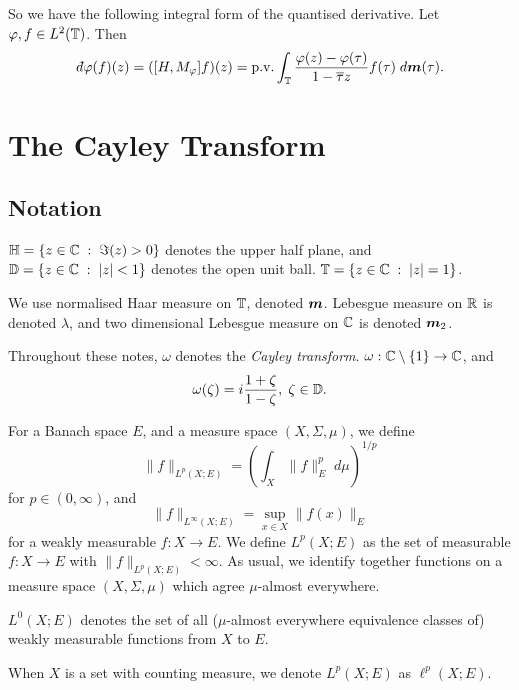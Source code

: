 So we have the following integral form of the quantised derivative. Let $\varphi,f \in L^2(\mathbb{T})$.
Then
\begin{equation*}
    \qd\varphi(f)(z) = ([H,M_\varphi]f)(z) = \pvint_\Circ \frac{\varphi(z)-\varphi(\tau)}{1-\overline{\tau}z}f(\tau)\;d\ha(\tau).
\end{equation*}

\section{The Cayley Transform}

\subsection{Notation}
$\mathbb{H} = \{z \in \mathbb{C}\;:\;\Im(z) > 0\}$ denotes the upper half plane,
and $\mathbb{D} = \{z\in \mathbb{C}\;:\; |z| < 1\}$ denotes the open unit ball.
$\mathbb{T} = \{z \in \mathbb{C}\;:\; |z| = 1\}$.

We use normalised Haar measure on $\mathbb{T}$, denoted $\boldsymbol{m}$. Lebesgue
measure on $\mathbb{R}$ is denoted $\lambda$, and two dimensional Lebesgue measure on
$\mathbb{C}$ is denoted $\boldsymbol{m}_2$.

Throughout these notes, $\omega$ denotes the \emph{Cayley transform}.
$\omega:\mathbb{C}\setminus\{1\}\rightarrow \mathbb{C}$, and 
\begin{equation*}
    \omega(\zeta) = i\frac{1+\zeta}{1-\zeta},\;\zeta \in \mathbb{D}.
\end{equation*}

For a Banach space $E$, and a measure space $(X,\Sigma,\mu)$, we define
\begin{equation*}
    \|f\|_{L^p(X;E)} = \left(\int_X \|f\|_E^p \;d\mu\right)^{1/p}
\end{equation*}
for $p \in (0,\infty)$, and
\begin{equation*}
    \|f\|_{L^\infty(X;E)} = \sup_{x \in X} \|f(x)\|_E
\end{equation*}
for a weakly measurable $f:X\rightarrow E$. We define $L^p(X;E)$ as the set
of measurable $f:X\rightarrow E$ with $\|f\|_{L^p(X;E)} < \infty$. As usual, 
we identify together functions on a measure space $(X,\Sigma,\mu)$ 
which agree $\mu$-almost everywhere.

$L^0(X;E)$ denotes the set of all ($\mu$-almost everywhere equivalence classes of)
weakly measurable functions from $X$ to $E$.

When $X$ is a set with counting measure, we denote $L^p(X;E)$ as $\ell^p(X;E)$.

